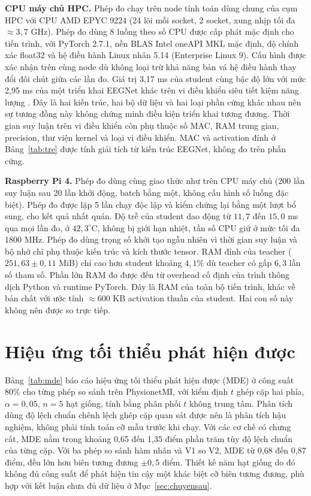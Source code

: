 \textbf{CPU máy chủ HPC.} Phép đo chạy trên node tính toán dùng chung của cụm HPC với CPU AMD EPYC
9224 (24 lõi mỗi socket, 2 socket, xung nhịp tối đa $\approx 3{,}7$ GHz).
Phép đo dùng 8 luồng theo số CPU được cấp phát mặc định cho tiến trình, với
PyTorch 2.7.1, nền BLAS Intel oneAPI MKL mặc định, độ chính xác float32 và
hệ điều hành Linux nhân 5.14 (Enterprise Linux 9). Cấu hình được xác
nhận trên cùng node dù không loại trừ khả năng bản vá hệ điều hành thay đổi
đôi chút giữa các lần đo. Giá trị 3,17 ms của student cùng bậc độ lớn với mức
2,95 ms của một triển khai EEGNet khác trên vi điều khiển siêu tiết kiệm năng
lượng \cite{wang2024mibminet}. Đây là hai kiến trúc, hai bộ dữ liệu và hai
loại phần cứng khác nhau nên sự tương đồng này không chứng minh điều kiện
triển khai tương đương. Thời gian suy luận trên vi điều khiển còn phụ thuộc
số MAC, RAM trung gian, precision, thư viện kernel và loại vi điều khiển. MAC
và activation đỉnh ở Bảng~\ref{tab:tre} được tính giải tích từ kiến trúc
EEGNet, không đo trên phần cứng.

\textbf{Raspberry Pi 4.} Phép đo dùng cùng giao thức như trên CPU máy chủ (200 lần suy luận sau 20
lần khởi động, batch bằng một, không cấu hình số luồng đặc biệt). Phép đo
được lặp 5 lần chạy độc lập và kiểm chứng lại bằng một lượt bổ sung, cho kết
quả nhất quán. Độ trễ của student dao động từ $11{,}7$ đến $15{,}0$ ms qua mọi
lần đo, ở $42{,}3^\circ$C, không bị giới hạn nhiệt, tần số CPU giữ ở mức tối đa 1800
MHz. Phép đo dùng trọng số khởi tạo ngẫu nhiên vì thời gian suy luận và bộ nhớ
chỉ phụ thuộc kiến trúc và kích thước tensor. RAM đỉnh của teacher
($251{,}63 \pm 0{,}11$ MiB) chỉ cao hơn student khoảng $4{,}1\%$ dù teacher có
gấp $6{,}3$ lần số tham số. Phần lớn RAM đo được đến từ overhead cố định của
trình thông dịch Python và runtime PyTorch. Đây là RAM của toàn bộ tiến trình, khác về bản chất với ước tính
$\approx 600$ KB activation thuần của student. Hai con số này không nên được
so trực tiếp.

\section{Hiệu ứng tối thiểu phát hiện được}
\label{app:mde}

Bảng~\ref{tab:mde} báo cáo hiệu ứng tối thiểu phát hiện được (MDE) ở công
suất 80\% cho từng phép so sánh trên PhysionetMI, với kiểm định $t$ ghép cặp
hai phía, $\alpha = 0{,}05$, $n = 5$ hạt giống, tính bằng phân phối $t$ không
trung tâm. Phân tích dùng độ lệch chuẩn chênh lệch ghép cặp quan sát được nên
là phân tích hậu nghiệm, không phải tính toán cỡ mẫu trước khi chạy. Với các
cơ chế có chưng cất, MDE nằm trong khoảng 0,65 đến 1,35 điểm phần trăm tùy độ
lệch chuẩn của từng cặp. Với
ba phép so sánh hàm nhân và V1 so V2, MDE từ 0,68 đến 0,87 điểm, đều lớn hơn
biên tương đương $\pm 0{,}5$ điểm. Thiết kế năm hạt giống do đó không đủ
công suất để phát hiện tin cậy một khác biệt cỡ biên tương đương, phù hợp với
kết luận chưa đủ dữ liệu ở Mục~\ref{sec:chuyensau}.

